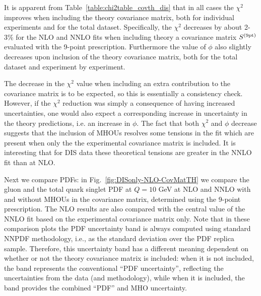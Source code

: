 

It is apparent from Table~\ref{table:chi2table_covth_dis} that in
all cases the $\chi^2$ improves when including the theory covariance
matrix, both for individual experiments and for the total dataset.
Specifically, the $\chi^2$ decreases by about 2-3\% for the NLO and
NNLO fits
when including theory a
covariance matrix $S^{\rm (9pt)}$ 
evaluated with the 9-point prescription.
Furthermore the value of $\phi$ also slightly decreases 
upon inclusion of the theory covariance matrix,
both for the total dataset and experiment by experiment.

The decrease in the $\chi^2$ value when including an extra
contribution to the covariance matrix is to be expected, so this is 
essentially a consistency check. However, if the
$\chi^2$ reduction was simply a consequence of having increased
uncertainties, one would also expect a corresponding increase in
uncertainty in the theory predictions, i.e. an increase in $\phi$.
The fact that both $\chi^2$ and $\phi$ decrease suggests that the
inclusion of MHOUs resolves some tensions in the fit which are present
when only the the experimental covariance matrix is included. It is 
interesting that for DIS data these theoretical tensions are greater 
in the NNLO fit than at NLO.

Next we compare PDFs: in Fig.~\ref{fig:DISonly-NLO-CovMatTH} we compare
the gluon and the  total quark singlet PDF   at $Q=10$ GeV at
NLO and NNLO with and without MHOUs in the covariance matrix, determined 
using the 9-point prescription.
      The NLO results are also compared with the central
      value of the NNLO fit based on the experimental covariance
      matrix only. Note that in these comparison plots the PDF
      uncertainty band is always computed using standard NNPDF
      methodology, i.e., as the standard deviation over the PDF
      replica sample. Therefore, this uncertainty band has a different
      meaning dependent on whether or not the theory covariance matrix is
      included: when it is not included, the band represents
       the conventional
      ``PDF uncertainty'', reflecting the uncertainties from the data
      (and methodology), while when it is included, the band provides the
      combined ``PDF'' and MHO uncertainty.


